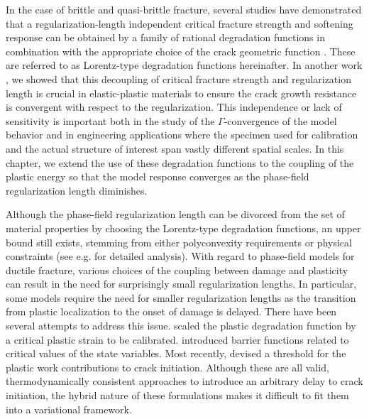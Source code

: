 
In the case of brittle and quasi-brittle fracture, several studies have demonstrated that a regularization-length independent critical fracture strength and softening response can be obtained by a family of rational degradation functions in combination with the appropriate choice of the crack geometric function \cite{lorentz2011convergence, wu2017unified, geelen2019phase}. These are referred to as Lorentz-type degradation functions hereinafter.  In another work \cite{brandon2020cohesive}, we showed that this decoupling of critical fracture strength and regularization length is crucial in elastic-plastic materials to ensure the crack growth resistance is convergent with respect to the regularization. This independence or lack of sensitivity is important both in the study of the $\Gamma$-convergence of the model behavior and in engineering applications where the specimen used for calibration and the actual structure of interest span vastly different spatial scales. In this chapter, we extend the use of these degradation functions to the coupling of the plastic energy so that the model response converges as the phase-field regularization length diminishes.

Although the phase-field regularization length can be divorced from the set of material properties by choosing the Lorentz-type degradation functions, an upper bound still exists, stemming from either polyconvexity requirements or physical constraints (see e.g. \cite{wu2017unified, geelen2019phase} for detailed analysis). With regard to phase-field models for ductile fracture, various choices of the coupling between damage and plasticity can result in the need for surprisingly small regularization lengths.  In particular, some models require the need for smaller regularization lengths as the transition from plastic localization to the onset of damage is delayed.
There have been several attempts to address this issue. \citet{ambati_phase-field_2015,ambati2016phase} scaled the plastic degradation function by a critical plastic strain to be calibrated. \citet{miehe2015phase} introduced barrier functions related to critical values of the state variables. Most recently, \citet{borden2016phase} devised a threshold for the plastic work contributions to crack initiation. Although these are all valid, thermodynamically consistent approaches to introduce an arbitrary delay to crack initiation, the hybrid nature of these formulations makes it difficult to fit them into a variational framework.

